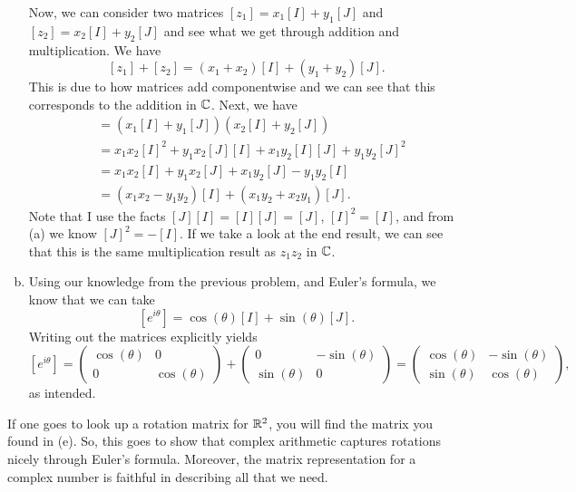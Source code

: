 \documentclass[12pt]{article} %
\begin{document}
\begin{solution}
\begin{enumerate}[(a)]
        Now, we can consider two matrices $[z_1] = x_1 [I] + y_1 [J]$ and $[z_2] = x_2 [I] + y_2 [J]$ and see what we get through addition and multiplication. We have
        \[
        [z_1] + [z_2] = (x_1 + x_2)[I] + (y_1 + y_2)[J].
        \]
        This is due to how matrices add componentwise and we can see that this corresponds to the addition in $\mathbb{C}$. Next, we have
        \begin{align*}
        [z_1][z_2] &= (x_1 [I] + y_1 [J])(x_2 [I] + y_2[J]) \\
        &= x_1 x_2 [I]^2 + y_1 x_2 [J][I] + x_1 y_2 [I][J] + y_1 y_2 [J]^2\\
        &= x_1 x_2 [I] + y_1 x_2 [J] + x_1 y_2 [J] - y_1 y_2 [I]\\
        &= (x_1 x_2 - y_1 y_2)[I] + (x_1 y_2 + x_2 y_1)[J].
        \end{align*}
        Note that I use the facts $[J][I]=[I][J]=[J]$, $[I]^2=[I]$, and from (a) we know $[J]^2=-[I]$.  If we take a look at the end result, we can see that this is the same multiplication result as $z_1 z_2$ in $\mathbb{C}$.

        \item Using our knowledge from the previous problem, and Euler's formula, we know that we can take
        \[
        [e^{i\theta}] = \cos (\theta) [I] + \sin(\theta)[J].
        \]
        Writing out the matrices explicitly yields
        \[
        [e^{i\theta}] = \begin{pmatrix} \cos(\theta) & 0 \\ 0 & \cos(\theta) \end{pmatrix} + \begin{pmatrix} 0 & - \sin(\theta) \\ \sin(\theta) & 0 \end{pmatrix} = \begin{pmatrix} \cos(\theta) & -\sin(\theta) \\ \sin(\theta) & \cos(\theta) \end{pmatrix},
        \]
        as intended. 
    \end{enumerate}
\begin{remark}
    If one goes to look up a rotation matrix for $\mathbb{R}^2$, you will find the matrix you found in (e).  So, this goes to show that complex arithmetic captures rotations nicely through Euler's formula. Moreover, the matrix representation for a complex number is faithful in describing all that we need.
\end{remark}
\end{solution}
\end{document}
